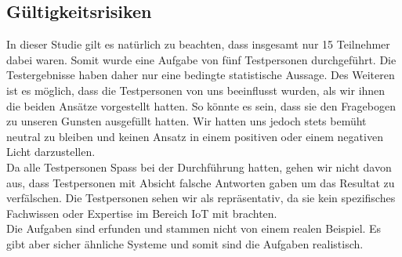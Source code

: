 \subsection{Gültigkeitsrisiken}
In dieser Studie gilt es natürlich zu beachten, dass insgesamt nur 15 Teilnehmer dabei waren. Somit wurde eine Aufgabe von fünf Testpersonen durchgeführt. Die Testergebnisse haben daher nur eine bedingte statistische Aussage. Des Weiteren ist es möglich, dass die Testpersonen von uns beeinflusst wurden, als wir ihnen die beiden Ansätze vorgestellt hatten. So könnte es sein, dass sie den Fragebogen zu unseren Gunsten ausgefüllt hatten. Wir hatten uns jedoch stets bemüht neutral zu bleiben und keinen Ansatz in einem positiven oder einem negativen Licht darzustellen.\\
Da alle Testpersonen Spass bei der Durchführung hatten, gehen wir nicht davon aus, dass Testpersonen mit Absicht falsche Antworten gaben um das Resultat zu verfälschen. Die Testpersonen sehen wir als repräsentativ, da sie kein spezifisches Fachwissen oder Expertise im Bereich IoT mit brachten.\\
Die Aufgaben sind erfunden und stammen nicht von einem realen Beispiel. Es gibt aber sicher ähnliche Systeme und somit sind die Aufgaben realistisch.